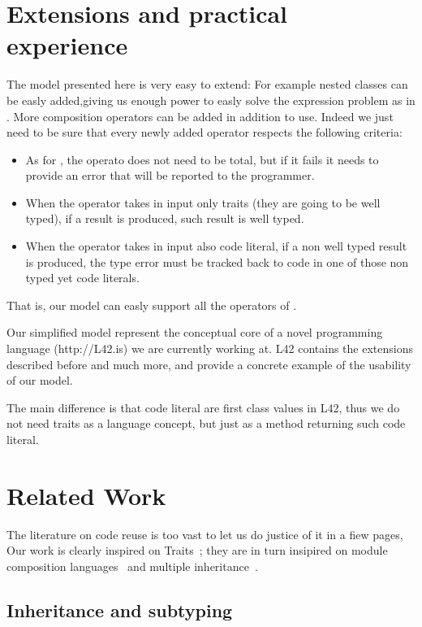 \section{Extensions and practical experience}
The model presented here is very easy to extend:
For example nested classes can be easly added,giving us enough power to easly solve the expression problem as in \cite{deepfjig}. More composition operators can be added in addition to use. Indeed
we just need to be sure that every newly added operator respects the following criteria:

\begin{itemize}
\item As for \use, the operato does not need to be total, but if it fails it needs to provide an error that will be reported to the programmer.
\item When the operator takes in input only traits (they are going to be well typed), if a result is produced,
 such result is well typed.
\item When the operator takes in input also code literal, if a non well typed result is produced,
the type error must be tracked back to code in one of those non typed yet code literals.
 \end{itemize}
 That is, our model can easly support all the operators of \cite{deep}.
 
 
 Our simplified model represent the conceptual core of  a novel programming language (http://L42.is)
 we are currently working at.
 L42 contains the extensions described before and much more, and provide a concrete example of the usability of our model.
 
 The main difference is that code literal are first class values in L42, thus we do not need traits as a language concept, but just as a method returning such code literal.
 
 
 
\section{Related Work}
The literature on code reuse is too vast to let us do justice of it in a fiew pages,
Our work is clearly inspired on Traits~\cite{ducasse2006traits}; they are in turn insipired on module composition languages~\cite{ancona2002calculus}
and multiple inheritance~\cite{}.

\subsection{Inheritance and subtyping}

